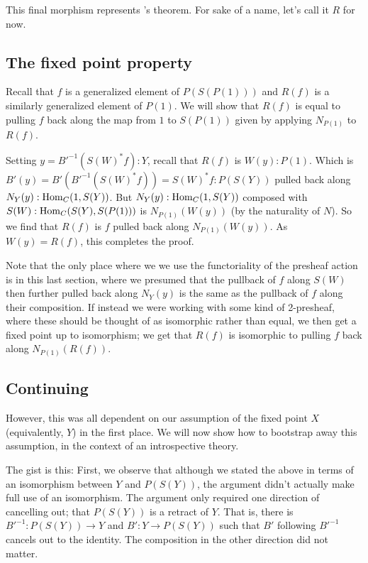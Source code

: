 This final morphism represents \Loeb's theorem. For sake of a name, let's call it $R$ for now.

\subsection{The fixed point property}
Recall that $f$ is a generalized element of $P(S(P(1)))$ and $R(f)$ is a similarly generalized element of $P(1)$. We will show that $R(f)$ is equal to pulling $f$ back along the map from $1$ to $S(P(1))$ given by applying $N_{P(1)}$ to $R(f)$.

Setting $y = B'^{-1}(S(W)^* f) : Y$, recall that $R(f)$ is $W(y) : P(1)$. Which is $B'(y) = B'(B'^{-1}(S(W)^* f)) = S(W)^* f : P(S(Y))$ pulled back along $N_Y(y) : \operatorname{Hom}_C(1, S(Y))$. But $N_Y(y) : \operatorname{Hom}_C(1, S(Y))$ composed with $S(W) : \operatorname{Hom}_C(S(Y), S(P(1)))$ is $N_{P(1)}(W(y))$ (by the naturality of $N$). So we find that $R(f)$ is $f$ pulled back along $N_{P(1)}(W(y))$. As $W(y) = R(f)$, this completes the proof.

\begin{TODOblock}
Note that the only place where we we use the functoriality of the presheaf action is in this last section, where we presumed that the pullback of $f$ along $S(W)$ then further pulled back along $N_Y(y)$ is the same as the pullback of $f$ along their composition. If instead we were working with some kind of 2-presheaf, where these should be thought of as isomorphic rather than equal, we then get a fixed point up to isomorphism; we get that $R(f)$ is isomorphic to pulling $f$ back along $N_{P(1)}(R(f))$. 
\end{TODOblock}

\subsection{Continuing}

However, this was all dependent on our assumption of the fixed point $X$ (equivalently, $Y$) in the first place. We will now show how to bootstrap away this assumption, in the context of an introspective theory. \TODO

The gist is this: First, we observe that although we stated the above in terms of an isomorphism between $Y$ and $P(S(Y))$, the argument didn't actually make full use of an isomorphism. The argument only required one direction of cancelling out; that $P(S(Y))$ is a retract of $Y$. That is, there is $B'^{-1} : P(S(Y)) \to Y$ and $B' : Y \to P(S(Y))$ such that $B'$ following $B'^{-1}$ cancels out to the identity. The composition in the other direction did not matter.

